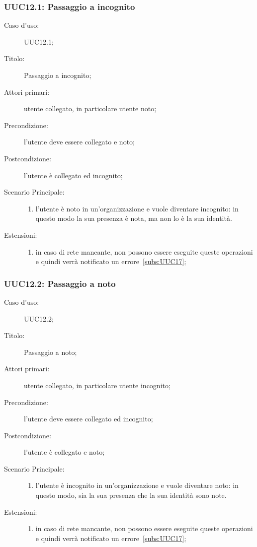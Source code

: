 \documentclass[../../../analisi-dei-requisiti.tex]{subfiles}
\begin{document}
\subsubsection{UUC12.1: Passaggio a incognito}%
\label{subs:UUC12.1}
\begin{description}
  \item[Caso d'uso:] UUC12.1;
  \item[Titolo:] Passaggio a incognito;
  \item[Attori primari:] utente collegato, in particolare utente noto;
  \item[Precondizione:] l'utente deve essere collegato e noto;
  \item[Postcondizione:] l'utente è collegato ed incognito;
  \item[Scenario Principale:]
        \begin{enumerate}
          \item l'utente è noto in un'organizzazione e vuole diventare incognito: in questo modo la sua presenza è nota, ma non lo è la sua identità.
        \end{enumerate}
  \item[Estensioni:]
        \begin{enumerate}
          \item in caso di rete mancante, non possono essere eseguite queste operazioni e quindi verrà notificato un errore~\ref{subs:UUC17};
        \end{enumerate}
\end{description}

\subsubsection{UUC12.2: Passaggio a noto}%
\label{subs:UUC12.2}
\begin{description}
  \item[Caso d'uso:] UUC12.2;
  \item[Titolo:] Passaggio a noto;
  \item[Attori primari:] utente collegato, in particolare utente incognito;
  \item[Precondizione:] l'utente deve essere collegato ed incognito;
  \item[Postcondizione:] l'utente è collegato e noto;
  \item[Scenario Principale:]
        \begin{enumerate}
          \item l'utente è incognito in un'organizzazione e vuole diventare noto: in questo modo, sia la sua presenza che la sua identità sono note.
        \end{enumerate}
  \item[Estensioni:]
        \begin{enumerate}
          \item in caso di rete mancante, non possono essere eseguite queste operazioni e quindi verrà notificato un errore~\ref{subs:UUC17};
        \end{enumerate}
\end{description}
\end{document}
